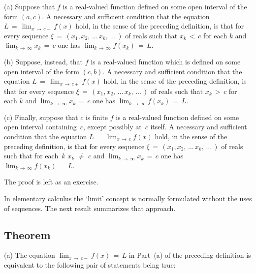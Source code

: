         (a) Suppose that $f$ is a real-valued function defined on some open interval of the form $(a,c)$.
    A necessary and sufficient condition that the equation $L \,=\, \lim_{x \,{\rightarrow}\, c-} f(x)$ hold, in the sense of the preceding definition,
    is that for every sequence ${\xi} \,=\, (x_{1}, x_{2},\,{\ldots}\,x_{k},\,{\ldots}\,)$ of reals such that
    $x_{k}\,<\,c$ for each $k$ and  $\lim_{k \,{\rightarrow}\, {\infty}} x_{k} \,=\, c$ one has $\lim_{k \,{\rightarrow}\, {\infty}} f(x_{k}) \,=\, L$.

\V

        (b) Suppose, instead, that $f$ is a real-valued function which is defined on some open interval of the form $(c,b)$.
    A necessary and sufficient condition that the equation $L \,=\, \lim_{x \,{\rightarrow}\, c+} f(x)$ hold, in the sense of the preceding definition,
    is that for every sequence ${\xi} \,=\, (x_{1}, x_{2},\,{\ldots}\,x_{k},\,{\ldots}\,)$ of reals such that
    $x_{k}\,>\,c$ for each $k$ and  $\lim_{k \,{\rightarrow}\, {\infty}} x_{k} \,=\, c$ one has $\lim_{k \,{\rightarrow}\, {\infty}} f(x_{k}) \,=\, L$.

\V

        (c) Finally, suppose that $c$ is finite $f$ is a real-valued function defined on some open interval containing~$c$, except possibly at~$c$ itself.
    A necessary and sufficient condition that the equation $L \,=\, \lim_{x \,{\rightarrow}\, c} f(x)$ hold, in the sense of the preceding definition,
    is that for every sequence ${\xi} \,=\, (x_{1}, x_{2},\,{\ldots}\,x_{k},\,{\ldots}\,)$ of reals such that for each~$k$
    $x_{k} \,\,{\neq}\,\, c$ and  $\lim_{k \,{\rightarrow}\, {\infty}} x_{k} \,=\, c$ one has $\lim_{k \,{\rightarrow}\, {\infty}} f(x_{k}) \,=\, L$.

\V

        The proof is left as an exercise.

\VV

        In elementary calculus the `limit' concept is normally formulated without the uses of sequences. The next result summarizes that approach.

\V


            \subsection{\small{\bf Theorem}}
            \label{ThmD50.30}

\V

\hspace*{\parindent}(a) The equation $\lim_{x \,{\rightarrow}\, c-} f(x) \,=\, L$ in Part~(a)
    of the preceding definition is equivalent to the following pair of statements being true:

